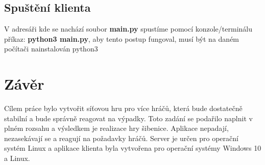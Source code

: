 \documentclass[12pt]{report}
\begin{document}
	\section{Spuštění klienta}
	
	V adresáři kde se nachází soubor \textbf{main.py} spustíme pomocí konzole/terminálu příkaz: \textbf{python3 main.py}, aby tento postup fungoval, musí být na daném počítači nainstalován python3
	
	
	
	
	\chapter{Závěr}
	
	Cílem práce bylo vytvořit síťovou hru pro více hráčů, která bude dostatečně stabilní a bude správně reagovat na výpadky. Toto zadání se podařilo naplnit v plném rozsahu a výsledkem je realizace hry šibenice. Aplikace nepadají, nezasekávají se a reagují na požadavky hráčů. Server je určen pro operační systém Linux a aplikace klienta byla vytvořena pro operační systémy Windows 10 a Linux.
	
\end{document}
